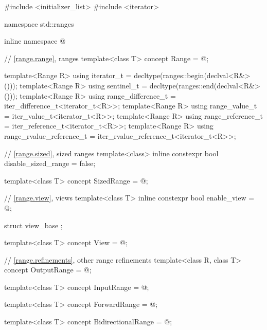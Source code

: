 %
\begin{codeblock}
#include <initializer_list>
#include <iterator>

namespace std::ranges {
  inline namespace @

  // \ref{range.range}, ranges
  template<class T>
    concept Range = @\seebelow@;

  template<Range R>
    using iterator_t = decltype(ranges::begin(declval<R&>()));
  template<Range R>
    using sentinel_t = decltype(ranges::end(declval<R&>()));
  template<Range R>
    using range_difference_t = iter_difference_t<iterator_t<R>>;
  template<Range R>
    using range_value_t = iter_value_t<iterator_t<R>>;
  template<Range R>
    using range_reference_t = iter_reference_t<iterator_t<R>>;
  template<Range R>
    using range_rvalue_reference_t = iter_rvalue_reference_t<iterator_t<R>>;

  // \ref{range.sized}, sized ranges
  template<class>
    inline constexpr bool disable_sized_range = false;

  template<class T>
    concept SizedRange = @\seebelow@;

  // \ref{range.view}, views
  template<class T>
    inline constexpr bool enable_view = @\seebelow@;

  struct view_base { };

  template<class T>
    concept View = @\seebelow@;

  // \ref{range.refinements}, other range refinements
  template<class R, class T>
    concept OutputRange = @\seebelow@;

  template<class T>
    concept InputRange = @\seebelow@;

  template<class T>
    concept ForwardRange = @\seebelow@;

  template<class T>
    concept BidirectionalRange = @\seebelow@;

}
\end{codeblock}
